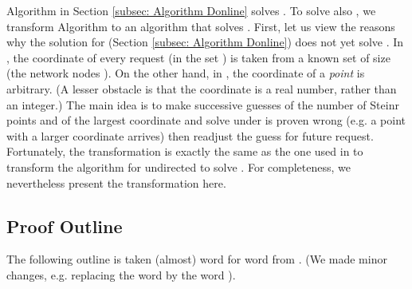 \documentclass[11pt]{article}
\begin{document}
\noindent Algorithm  in Section \ref{subsec: Algorithm Donline} solves .
To solve also , we transform Algorithm  to an algorithm  that solves .
First, let us view the reasons why the  solution for  (Section \ref{subsec: Algorithm Donline}) does not yet solve .
In ,  the  coordinate of every request (in the set ) is taken from a known set of size  (the network nodes ).
On the other hand, in , the  coordinate of a {\em point} is arbitrary.
(A lesser obstacle is that the  coordinate is a real number, rather than an integer.)
The main idea is to make successive guesses of the number of Steinr points and of the largest  coordinate and solve under is proven wrong
(e.g. a point with a larger  coordinate arrives) then readjust the guess for future request.
Fortunately, the transformation is exactly the same as the one used in \cite{KK2014TR,KK2014} to transform the algorithm for undirected  to solve .
For completeness, we nevertheless present the transformation here.

















\subsection{Proof Outline}
\label{App;subsec:Proof Outline}
The following outline is taken (almost) word for word from \cite{KK2014}.
(We made minor changes, e.g. replacing the word  by the word ).
\end{document}
